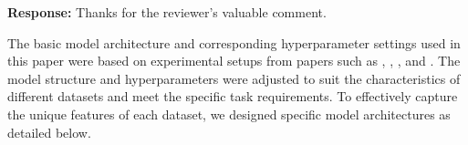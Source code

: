 \documentclass[a4paper,twoside,11pt,dvipsnames]{reviewresponse}
\begin{document}




\textbf{Response:} Thanks for the reviewer's valuable comment. 

The basic model architecture and corresponding hyperparameter settings used in this paper were based on experimental setups from papers such as \cite{sun2021fl}, \cite{zhu2023combating}, \cite{liang2020think}, \cite{zhu2024isfl} and \cite{zhou2022adversarial}. The model structure and hyperparameters were adjusted to suit the characteristics of different datasets and meet the specific task requirements. To effectively capture the unique features of each dataset, we designed specific model architectures as detailed below.
\end{document}
